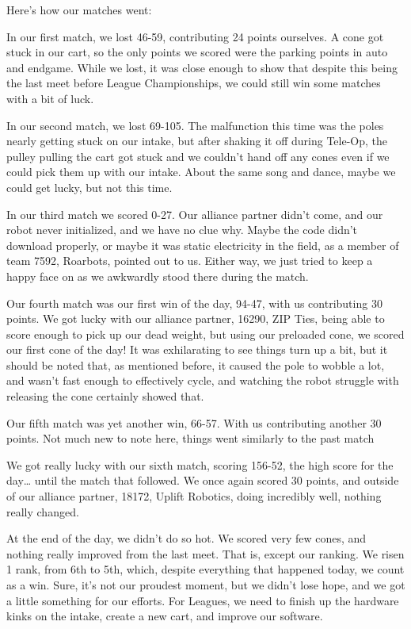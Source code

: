 Here’s how our matches went:

In our first match, we lost 46-59, contributing 24 points ourselves. A cone got stuck in our cart, so the only points we scored were the parking points in auto and endgame. While we lost, it was close enough to show that despite this being the last meet before League Championships, we could still win some matches with a bit of luck.

In our second match, we lost 69-105. The malfunction this time was the poles nearly getting stuck on our intake, but after shaking it off during Tele-Op, the pulley pulling the cart got stuck and we couldn’t hand off any cones even if we could pick them up with our intake. About the same song and dance, maybe we could get lucky, but not this time.

In our third match we scored 0-27. Our alliance partner didn’t come, and our robot never initialized, and we have no clue why. Maybe the code didn’t download properly, or maybe it was static electricity in the field, as a member of team 7592, Roarbots, pointed out to us. Either way, we just tried to keep a happy face on as we awkwardly stood there during the match.

Our fourth match was our first win of the day, 94-47, with us contributing 30 points. We got lucky with our alliance partner, 16290, ZIP Ties, being able to score enough to pick up our dead weight, but using our preloaded cone, we scored our first cone of the day! It was exhilarating to see things turn up a bit, but it should be noted that, as mentioned before, it caused the pole to wobble a lot, and wasn’t fast enough to effectively cycle, and watching the robot struggle with releasing the cone certainly showed that.

Our fifth match was yet another win, 66-57. With us contributing another 30 points. Not much new to note here, things went similarly to the past match

We got really lucky with our sixth match, scoring 156-52, the high score for the day… until the match that followed. We once again scored 30 points, and outside of our alliance partner, 18172, Uplift Robotics, doing incredibly well, nothing really changed.

At the end of the day, we didn’t do so hot. We scored very few cones, and nothing really improved from the last meet. That is, except our ranking. We risen 1 rank, from 6th to 5th, which, despite everything that happened today, we count as a win. Sure, it’s not our proudest moment, but we didn’t lose hope, and we got a little something for our efforts. For Leagues, we need to finish up the hardware kinks on the intake, create a new cart, and improve our software.

